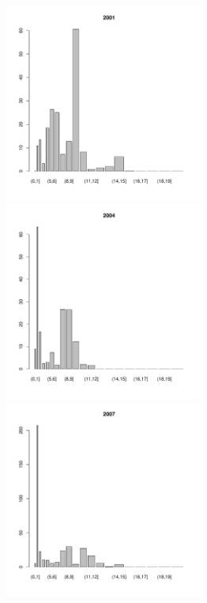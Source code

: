 \documentclass[12pt, a4paper]{article}
\begin{document}
\begin{figure}[h]

\begin{multicols}{3}
\hfill
\includegraphics[width=65mm]{../White_Sea/Estuatiy_Luvenga/sizestr_percents_2001_.pdf}
\hfill
\includegraphics[width=65mm]{../White_Sea/Estuatiy_Luvenga/sizestr_percents_2004_.pdf}
\hfill
\includegraphics[width=65mm]{../White_Sea/Estuatiy_Luvenga/sizestr_percents_2007_.pdf}
\end{multicols}


\end{figure}
\end{document}
